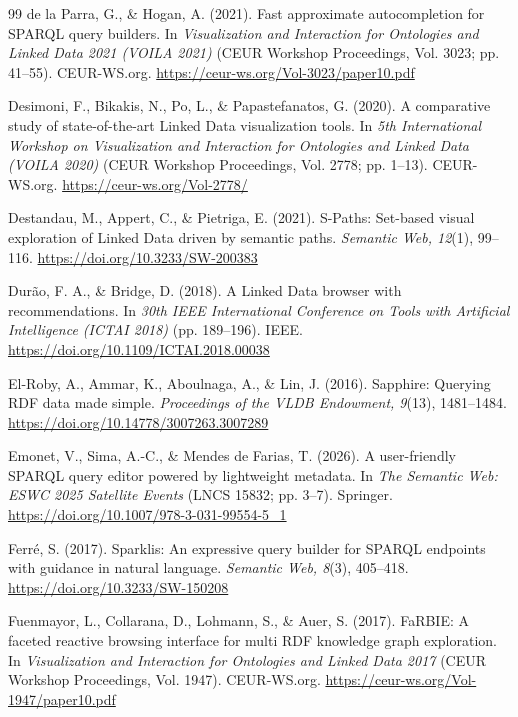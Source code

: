 \documentclass[manuscript,review,screen]{acmart}
\begin{document}
\begin{thebibliography}{99}
 de la Parra, G., \& Hogan, A. (2021). Fast approximate autocompletion for SPARQL query builders. In \textit{Visualization and Interaction for Ontologies and Linked Data 2021 (VOILA 2021)} (CEUR Workshop Proceedings, Vol. 3023; pp. 41--55). CEUR-WS.org. \url{https://ceur-ws.org/Vol-3023/paper10.pdf}

 Desimoni, F., Bikakis, N., Po, L., \& Papastefanatos, G. (2020). A comparative study of state-of-the-art Linked Data visualization tools. In \textit{5th International Workshop on Visualization and Interaction for Ontologies and Linked Data (VOILA 2020)} (CEUR Workshop Proceedings, Vol. 2778; pp. 1--13). CEUR-WS.org. \url{https://ceur-ws.org/Vol-2778/}

 Destandau, M., Appert, C., \& Pietriga, E. (2021). S-Paths: Set-based visual exploration of Linked Data driven by semantic paths. \textit{Semantic Web, 12}(1), 99--116. \url{https://doi.org/10.3233/SW-200383}

 Dur\~{a}o, F. A., \& Bridge, D. (2018). A Linked Data browser with recommendations. In \textit{30th IEEE International Conference on Tools with Artificial Intelligence (ICTAI 2018)} (pp. 189--196). IEEE. \url{https://doi.org/10.1109/ICTAI.2018.00038}

 El-Roby, A., Ammar, K., Aboulnaga, A., \& Lin, J. (2016). Sapphire: Querying RDF data made simple. \textit{Proceedings of the VLDB Endowment, 9}(13), 1481--1484. \url{https://doi.org/10.14778/3007263.3007289}

 Emonet, V., Sima, A.-C., \& Mendes de Farias, T. (2026). A user-friendly SPARQL query editor powered by lightweight metadata. In \textit{The Semantic Web: ESWC 2025 Satellite Events} (LNCS 15832; pp. 3--7). Springer. \url{https://doi.org/10.1007/978-3-031-99554-5_1}

 Ferr\'{e}, S. (2017). Sparklis: An expressive query builder for SPARQL endpoints with guidance in natural language. \textit{Semantic Web, 8}(3), 405--418. \url{https://doi.org/10.3233/SW-150208}

 Fuenmayor, L., Collarana, D., Lohmann, S., \& Auer, S. (2017). FaRBIE: A faceted reactive browsing interface for multi RDF knowledge graph exploration. In \textit{Visualization and Interaction for Ontologies and Linked Data 2017} (CEUR Workshop Proceedings, Vol. 1947). CEUR-WS.org. \url{https://ceur-ws.org/Vol-1947/paper10.pdf}


\end{thebibliography}
\end{document}
